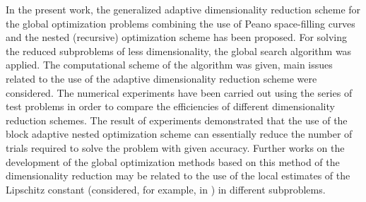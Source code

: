 \documentclass[runningheads]{llncs}
\begin{document}
In the present work, the generalized adaptive dimensionality reduction scheme for the global optimization problems 
combining the use of Peano space-filling curves and the nested (recursive) optimization scheme has been proposed.
For solving the reduced subproblems of less dimensionality, the global search algorithm was applied. 
The computational scheme of the algorithm was given, main issues related to the use of the adaptive dimensionality 
reduction scheme were considered.
The numerical experiments have been carried out using the series of test problems in order to compare the efficiencies of 
different dimensionality reduction schemes.  
The result of experiments demonstrated that the use of the block adaptive nested optimization scheme can essentially reduce the 
number of trials required to solve the problem with given accuracy. 
Further works on the development of the global optimization methods based on this method of the 
dimensionality reduction may be related to the use of the local estimates of the Lipschitz constant (considered, for example, in \cite{Grishagin2015,Sergeyev2016}) in different subproblems.


%
%
%
 
 
\end{document}
